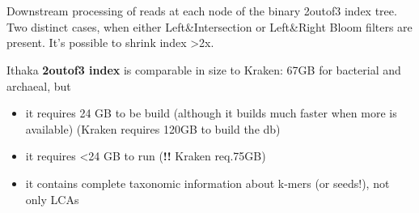 \documentclass[portrait,final,a0paper,fontscale=0.277]{baposter}
\begin{document}
\begin{poster}
{\begin{minipage}{0.35\textwidth}
\ \\ 
\ \\ \ \\ \ \\ \ \\ \ \\ \ \\
Downstream processing of reads at each node of the binary 2outof3 index tree. Two distinct cases, when either Left\&Intersection or Left\&Right Bloom filters are present. It's possible to shrink index >2x.
\end{minipage} 
\vspace{0em}

{\sc Ithaka} {\bf 2outof3 index} is comparable in size to {\sc Kraken}: 67GB for bacterial and archaeal, but
\vspace{-0.7em}
\begin{itemize}[leftmargin=*]
\setlength\itemsep{-0.2em}
\item it requires 24 GB to be build (although it builds much faster when more is available) (Kraken requires 120GB to build the db)
\item it requires <24 GB to run ({\bf !!} {\sc Kraken} req.75GB)
\item it contains complete taxonomic information about k-mers (or seeds!), not only LCAs  
\end{itemize}
}
\end{poster}
\end{document}
